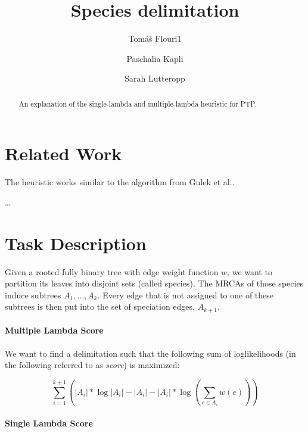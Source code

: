 \documentclass{llncs}
\begin{document}
\title{Species delimitation}


\author{Tom\'{a}\v{s} Flouri1 \and Paschalia Kapli \and Sarah Lutteropp}

\maketitle

\begin{abstract}
An explanation of the single-lambda and multiple-lambda heuristic for PTP.
\end{abstract}

\section{Related Work}

The heuristic works similar to the algorithm from Gulek et al.\cite{Gulek:2010:DPA:1838770.1839019}.

\ldots

\section{Task Description}

Given a rooted fully binary tree with edge weight function $w$, we want to partition its leaves into disjoint sets (called species). The MRCAs of those species induce subtrees $A_1, \ldots, A_{k}$. Every edge that is not assigned to one of these subtrees is then put into the set of speciation edges, $A_{k+1}$.

\paragraph{Multiple Lambda Score}

We want to find a delimitation such that the following sum of loglikelihoods (in the following referred to as \emph{score}) is maximized:

$$\sum_{i=1}^{k+1}{ \left(|A_i| * \log |A_i| - |A_i| - |A_i| * \log\left( \sum_{e \in A_i}{w(e)} \right) \right)}$$

\paragraph{Single Lambda Score}
\end{document}
